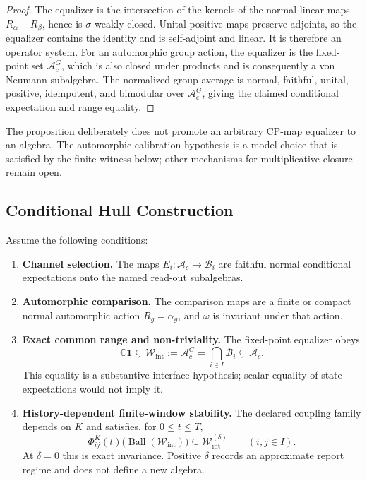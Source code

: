 \documentclass[12pt]{article}
\theoremstyle{definition}
\theoremstyle{remark}
\newcommand{\Ac}{\mathcal A_c}
\newcommand{\Wint}{\mathcal W_{\mathrm{int}}}
\begin{document}
\begin{proof}
The equalizer is the intersection of the kernels of the normal linear
maps \(R_\alpha-R_\beta\), hence is \(\sigma\)-weakly closed. Unital
positive maps preserve adjoints, so the equalizer contains the identity
and is self-adjoint and linear. It is therefore an operator system. For
an automorphic group action, the equalizer is the fixed-point set
\(\Ac^G\), which is also closed under products and is consequently a von
Neumann subalgebra. The normalized group average is normal, faithful,
unital, positive, idempotent, and bimodular over \(\Ac^G\), giving the
claimed conditional expectation and range equality.
\end{proof}

The proposition deliberately does not promote an arbitrary CP-map
equalizer to an algebra. The automorphic calibration hypothesis is a
model choice that is satisfied by the finite witness below; other
mechanisms for multiplicative closure remain open.

\subsection{Conditional Hull Construction}

Assume the following conditions:
\begin{enumerate}[label=(H\arabic*)]
\item[(H0)] \textbf{Channel selection.} The maps
\(E_i:\Ac\to\mathcal B_i\) are faithful normal conditional expectations
onto the named read-out subalgebras.
\item \textbf{Automorphic comparison.} The comparison maps are a finite
or compact normal automorphic action \(R_g=\alpha_g\), and \(\omega\) is
invariant under that action.
\item \textbf{Exact common range and non-triviality.} The fixed-point
equalizer obeys
\[
\mathbb C\mathbf1
\subsetneq
\Wint:=\Ac^G
=
\bigcap_{i\in I}\mathcal B_i
\subsetneq\Ac.
\]
This equality is a substantive interface hypothesis; scalar equality of
state expectations would not imply it.
\item \textbf{History-dependent finite-window stability.} The declared
coupling family depends on \(K\) and satisfies, for \(0\leq t\leq T\),
\[
\Phi_{ij}^{K}(t)
\bigl(\operatorname{Ball}(\Wint)\bigr)
\subseteq
\Wint^{(\delta)}
\qquad(i,j\in I).
\]
At \(\delta=0\) this is exact invariance. Positive \(\delta\) records an
approximate report regime and does not define a new algebra.
\end{enumerate}
\end{document}
